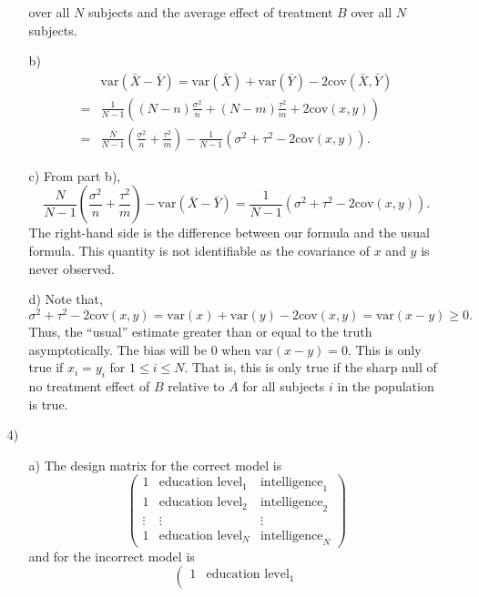 \documentclass{article}
\newcommand{\var}[0]{\text{var}}
\newcommand{\cov}[0]{\text{cov}}
\begin{document}
\begin{itemize}
\begin{itemize}
      over all $N$ subjects and the average effect of treatment $B$ over all $N$ subjects.  
    \item[b)]
      \begin{align*}
	&\var(\bar X - \bar Y) = \var(\bar X) + \var(\bar Y) - 2\cov(\bar X,\bar Y) \\
	=& \frac 1 {N-1}\left( {(N - n)}\frac{ \sigma^2}n + {(N-m)}\frac{\tau^2}m + 2\cov(x,y)\right)\\
	= &\frac N {N-1}\left(\frac{\sigma^2}{n}+ \frac{\tau^2}{m}\right) - 
	\frac{1}{N-1}(\sigma^2 + \tau^2 - 2\cov(x,y)).
       \end{align*}
   \item[c)]
     From part b),
       $$
	\frac N {N-1}\left(\frac{\sigma^2}{n}+ \frac{\tau^2}{m}\right) - 
	\var(\bar X - \bar Y) = \frac{1}{N-1}(\sigma^2 + \tau^2 - 2\cov(x,y)).
       $$
     The right-hand side is the difference between our formula and the usual formula.  
     This quantity is not identifiable as the covariance of $x$ and $y$ is never observed.
   \item[d)]
     Note that,
       $$
         \sigma^2 + \tau^2 - 2\cov(x,y) = \var(x) + \var(y) - 2\cov(x,y) = \var(x-y) \geq 0.
       $$
     Thus, the ``usual'' estimate greater than or equal to the truth asymptotically.  
     The bias will be 0 when $\var(x-y) = 0$.  
     This is only true if $x_i = y_i$ for $1\leq i \leq N$.  
     That is, this is only true if the sharp null of no treatment effect of $B$ relative to $A$
     for all subjects $i$ in the population is true.
  \end{itemize}
  \item[4)]
  \begin{itemize}
    \item[a)]The design matrix for the correct model is
      $$
        \left(
          \begin{array}{ccc} 
            1 & \text{education level}_1 & \text{intelligence}_1 \\
            1 & \text{education level}_2 & \text{intelligence}_2 \\
            \vdots & \vdots & \vdots \\
            1 & \text{education level}_N & \text{intelligence}_N 
          \end{array}
        \right)
      $$
      and for the incorrect model is
      $$
        \left (
          \begin{array}{cc}
            1 & \text{education level}_1  \\

\end{array}$$
\end{itemize}
\end{itemize}
\end{document}
